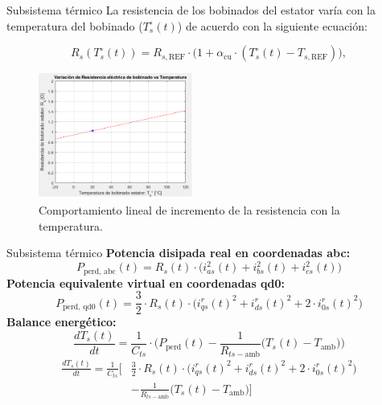 \documentclass[12pt]{beamer}
\begin{document}
\begin{frame}{Subsistema térmico}\footnotesize
    La resistencia de los bobinados del estator varía con la temperatura del bobinado (\(T_s^\circ(t)\)) de acuerdo con la siguiente ecuación:
    
    \begin{equation}
    R_s(T_s^\circ(t)) = R_{s, \text{REF}} \cdot \Big( 1 + \alpha_\text{cu} \cdot (T_s^\circ(t) - T_{s, \text{REF}}) \Big),
    \end{equation}  

    \begin{figure}[h]
        \centering
        \includegraphics[width=0.45\textwidth]{Imagenes/Variacion_resistencia_temperatura.png}
        \caption{Comportamiento lineal de incremento de la resistencia con la temperatura.}
    \end{figure}
\end{frame}

\begin{frame}{Subsistema térmico}\footnotesize
    \textbf{Potencia disipada real en coordenadas abc:}
    \begin{equation}
    P_{\text{perd, abc}}(t) = R_s(t) \cdot \Big( i_{as}^2(t) + i_{bs}^2(t) + i_{cs}^2(t) \Big)
    \end{equation}
    \textbf{Potencia equivalente virtual en coordenadas qd0:}
    \begin{equation}
    P_{\text{perd, qd0}}(t) = \frac{3}{2} \cdot R_s(t) \cdot \Big( i_{qs}^r(t)^2 + i_{ds}^r(t)^2 + 2 \cdot i_{0s}^r(t)^2 \Big)
    \end{equation}
    \textbf{Balance energético:}
    \begin{equation}
    \frac{dT_s(t)}{dt} = \frac{1}{C_{ts}} \cdot \Big( P_{\text{perd}}(t) - \frac{1}{R_{ts-\text{amb}}} \big( T_s(t) - T_{\text{amb}} \big) \Big)
    \end{equation}
\begin{equation}
\label{eq:subsistema_termico}
\begin{split}
    \frac{dT_s(t)}{dt} = \frac{1}{C_{ts}} \Big[ &\frac{3}{2} \cdot R_s(t) \cdot \Big( i_{qs}^r(t)^2 + i_{ds}^r(t)^2 + 2 \cdot i_{0s}^r(t)^2 \Big) \\
    &- \frac{1}{R_{ts-\text{amb}}} \big( T_s(t) - T_{\text{amb}} \big) \Big]
\end{split}
\end{equation}
\end{frame}
\end{document}
